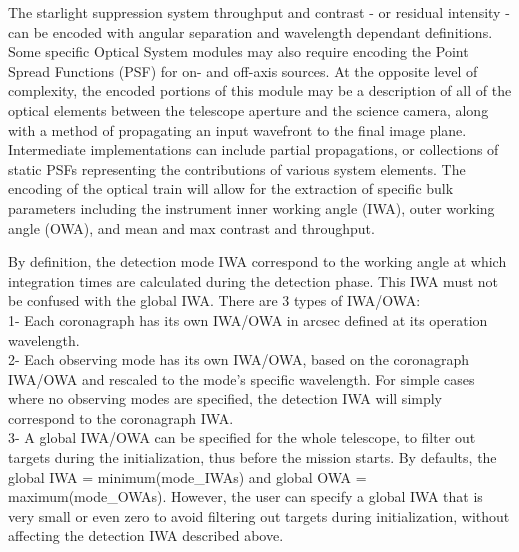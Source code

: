 \documentclass[cleanfoot]{asme2ej}
\begin{document}
The starlight suppression system throughput and contrast - or residual intensity - can be encoded with angular separation and wavelength dependant definitions. Some specific Optical System modules may also require encoding the Point Spread Functions (PSF) for on- and off-axis sources. At the opposite level of complexity, the encoded portions of this module may be a description of all of the optical elements between the telescope aperture and the science camera, along with a method of propagating an input wavefront to the final image plane.  Intermediate implementations can include partial propagations, or collections of static PSFs representing the contributions of various system elements.  The encoding of the optical train will allow for the extraction of specific bulk parameters including the instrument inner working angle (IWA), outer working angle (OWA), and mean and max contrast and throughput.

By definition, the detection mode IWA correspond to the working angle at which integration times are calculated during the detection phase. This IWA must not be confused with the global IWA. There are 3 types of IWA/OWA:\\
1- Each coronagraph has its own IWA/OWA in arcsec defined at its operation wavelength.\\
2- Each observing mode has its own IWA/OWA, based on the coronagraph IWA/OWA and rescaled to the mode’s specific wavelength. For simple cases where no observing modes are specified, the detection IWA will simply correspond to the coronagraph IWA.\\
3- A global IWA/OWA can be specified for the whole telescope, to filter out targets during the initialization, thus before the mission starts. By defaults, the global IWA = minimum(mode\_IWAs) and global OWA = maximum(mode\_OWAs). However, the user can specify a global IWA that is very small or even zero to avoid filtering out targets during initialization, without affecting the detection IWA described above.
\end{document}
